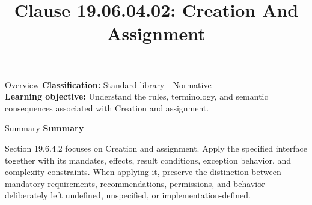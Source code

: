 \documentclass[10pt,letterpaper]{article}
\title{Clause 19.06.04.02: Creation And Assignment}
\author{}
\date{}
\begin{document}
\maketitle
\begin{CornellOverviewBox}{Overview}
\textbf{Classification:} Standard library - Normative\\[2pt]
\textbf{Learning objective:} Understand the rules, terminology, and semantic consequences associated with Creation and assignment.
\end{CornellOverviewBox}\begin{CornellSummaryBox}{Summary}
{\sffamily\bfseries\color{Accent} Summary}\par\vspace{3pt}Section 19.6.4.2 focuses on Creation and assignment. Apply the specified interface together with its mandates, effects, result conditions, exception behavior, and complexity constraints. When applying it, preserve the distinction between mandatory requirements, recommendations, permissions, and behavior deliberately left undefined, unspecified, or implementation-defined.
\end{CornellSummaryBox}
\end{document}
